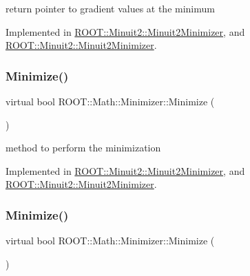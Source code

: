 return pointer to gradient values at the minimum 



Implemented in \mbox{\hyperlink{classROOT_1_1Minuit2_1_1Minuit2Minimizer_a52c6b3a13108b64366b1acd43f7e2b9a}{R\+O\+O\+T\+::\+Minuit2\+::\+Minuit2\+Minimizer}}, and \mbox{\hyperlink{classROOT_1_1Minuit2_1_1Minuit2Minimizer_a52c6b3a13108b64366b1acd43f7e2b9a}{R\+O\+O\+T\+::\+Minuit2\+::\+Minuit2\+Minimizer}}.

\mbox{\label{classROOT_1_1Math_1_1Minimizer_a5f6a6307935a17fb13dac1ee7f1c41fd}} 
\subsubsection{\texorpdfstring{Minimize()}{Minimize()}\hspace{0.1cm}{\footnotesize\ttfamily [1/2]}}
{\footnotesize\ttfamily virtual bool R\+O\+O\+T\+::\+Math\+::\+Minimizer\+::\+Minimize (\begin{DoxyParamCaption}{ }\end{DoxyParamCaption})\hspace{0.3cm}{\ttfamily [pure virtual]}}



method to perform the minimization 



Implemented in \mbox{\hyperlink{classROOT_1_1Minuit2_1_1Minuit2Minimizer_af5d2da195d2b1a7eac6d9b8859eec2b9}{R\+O\+O\+T\+::\+Minuit2\+::\+Minuit2\+Minimizer}}, and \mbox{\hyperlink{classROOT_1_1Minuit2_1_1Minuit2Minimizer_af5d2da195d2b1a7eac6d9b8859eec2b9}{R\+O\+O\+T\+::\+Minuit2\+::\+Minuit2\+Minimizer}}.

\mbox{\label{classROOT_1_1Math_1_1Minimizer_a5f6a6307935a17fb13dac1ee7f1c41fd}} 
\subsubsection{\texorpdfstring{Minimize()}{Minimize()}\hspace{0.1cm}{\footnotesize\ttfamily [2/2]}}
{\footnotesize\ttfamily virtual bool R\+O\+O\+T\+::\+Math\+::\+Minimizer\+::\+Minimize (\begin{DoxyParamCaption}{ }\end{DoxyParamCaption})\hspace{0.3cm}{\ttfamily [pure virtual]}}



